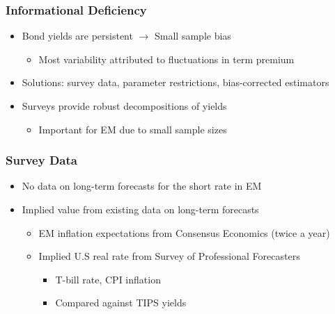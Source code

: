 \documentclass[12pt, aspectratio=169, xcolor=dvipsnames]{beamer}  %
\begin{document}
\begin{frame}
	\frametitle{Informational Deficiency}
	\begin{itemize}
		\item Bond yields are persistent $\rightarrow$ Small sample bias \citep{KimOrphanides:2012}
		\begin{itemize}
			\item Most variability attributed to fluctuations in term premium
		\end{itemize}
	\item Solutions: survey data, parameter restrictions, bias-corrected estimators
	\item \alert{Surveys} provide robust decompositions of yields \citep{Guimaraes:2014}
	\begin{itemize}
		\item Important for EM due to small sample sizes
	\end{itemize}
	\end{itemize}
\end{frame}

\begin{frame}[label=SCBP]
\frametitle{Survey Data}
\begin{itemize}
	\item No data on long-term forecasts for the short rate in EM
	\item Implied value from existing data on long-term forecasts
	\begin{itemize}
		\item EM inflation expectations from Consensus Economics (twice a year)
		\item Implied U.S real rate from Survey of Professional Forecasters
		\begin{itemize}
			\item T-bill rate, CPI inflation
			\item Compared against TIPS yields
		\end{itemize}
	\end{itemize}
\end{itemize}
\end{frame}
\end{document}
